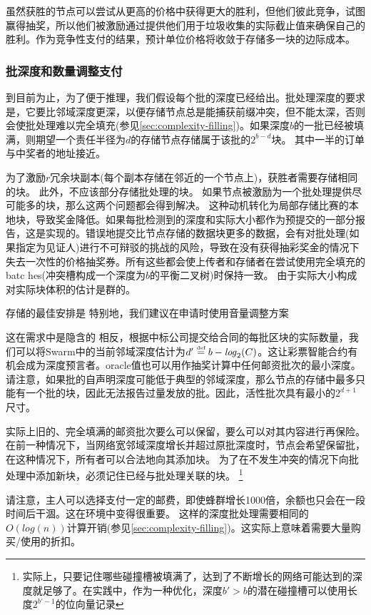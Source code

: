 虽然获胜的节点可以尝试从更高的价格中获得更大的胜利，但他们彼此竞争，试图赢得抽奖，所以他们被激励通过提供他们用于垃圾收集的实际截止值来确保自己的胜利。作为竞争性支付的结果，预计单位价格将收敛于存储多一块的边际成本。




\subsubsection{批深度和数量调整支付}

到目前为止，为了便于推理，我们假设每个批的深度已经给出。批处理深度的要求是，它要比邻域深度更深，以便存储节点总是能捕获前缀冲突，但不能太深，否则会使批处理难以完全填充(参见\ref{sec:complexity-filling})。如果深度$b$的一批已经被填满，则期望一个责任半径为$d$的存储节点存储属于该批的$2^{b-d}$块。
其中一半的订单与中奖者的地址接近。

为了激励$r$冗余块副本(每个副本存储在邻近的一个节点上)，获胜者需要存储相同的块。
此外，不应该部分存储批处理的块。
如果节点被激励为一个批处理提供尽可能多的块，那么这两个问题都会得到解决。
这种动机转化为局部存储比赛的本地块，导致奖金降低。如果每批检测到的深度和实际大小都作为预提交的一部分报告，这是实现的。错误地提交比节点存储的数据块更多的数据，会有对批处理(如果指定为见证人)进行不可辩驳的挑战的风险，导致在没有获得抽彩奖金的情况下失去一次性的价格抽奖券。所有这些都会使上传者和存储者在尝试使用完全填充的batc hes(冲突槽构成一个深度为$b$的平衡二叉树)时保持一致。
由于实际大小构成对实际块体积的估计是群的。

存储的最佳安排是
特别地，我们建议在申请时使用音量调整方案

这在需求中是隐含的
相反，根据中标公司提交给合同的每批区块的实际数量，我们可以将Swarm中的当前邻域深度估计为$d'\overset{\textrm{\tiny def}}{=} b - \mathit{log}_2(C)$。这让彩票智能合约有机会成为深度预言者。oracle值也可以用作抽奖计算中任何邮资批次的最小深度。请注意，如果批的自声明深度可能低于典型的邻域深度，那么节点的存储中最多只能有一个批的块，因此无法报告过量发放的批。因此，活性批次具有最小的$2^{d+1}$尺寸。


实际上旧的、完全填满的邮资批次要么可以保留，要么可以对其内容进行再保险。在前一种情况下，当网络宽邻域深度增长并超过原批深度时，节点会希望保留批，在这种情况下，所有者可以合法地向其添加块。
为了在不发生冲突的情况下向批处理中添加新块，必须记住已经与批处理关联的块。%
%
\footnote{实际上，只要记住哪些碰撞槽被填满了，达到了不断增长的网络可能达到的深度就足够了。在实践中，作为一种优化，深度$b' >b$的潜在碰撞槽可以使用长度$2^{b'-1}$的位向量记录}
%

请注意，主人可以选择支付一定的邮费，即使蜂群增长1000倍，余额也只会在一段时间后干涸。这在环境中变得很重要。
这样的深度批处理需要相同的$O(\mathit{log}(n))$计算开销(参见\ref{sec:complexity-filling})。这实际上意味着需要大量购买/使用的折扣。





